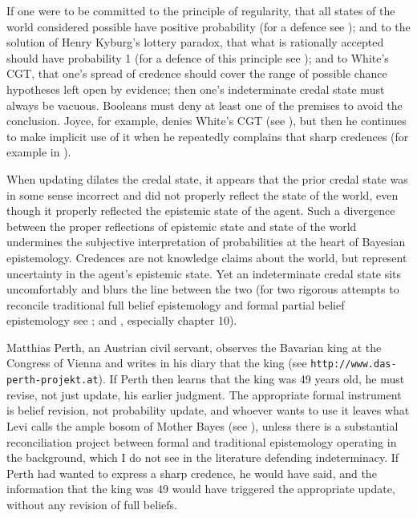 If one were to be committed to the principle of regularity, that all states of the world considered possible have positive probability (for a defence see ); and to the solution of Henry Kyburg's lottery paradox, that what is rationally accepted should have probability 1 (for a defence of this principle see ); and to White's CGT, that one's spread of credence should cover the range of possible chance hypotheses left open by evidence; then one's indeterminate credal state must always be vacuous. Booleans must deny at least one of the premises to avoid the conclusion. Joyce, for example, denies White's CGT (see ), but then he continues to make implicit use of it when he repeatedly complains that sharp credences  (for example in ).

When updating dilates the credal state, it appears that the prior credal state was in some sense incorrect and did not properly reflect the state of the world, even though it properly reflected the epistemic state of the agent. Such a divergence between the proper reflections of epistemic state and state of the world undermines the subjective interpretation of probabilities at the heart of Bayesian epistemology. Credences are not knowledge claims about the world, but represent uncertainty in the agent's epistemic state. Yet an indeterminate credal state sits uncomfortably and blurs the line between the two (for two rigorous attempts to reconcile traditional full belief epistemology and formal partial belief epistemology see ; and , especially chapter 10).

Matthias Perth, an Austrian civil servant, observes the Bavarian king at the Congress of Vienna and writes in his diary that the king  (see \texttt{http://www.das-perth-projekt.at}). If Perth then learns that the king was 49 years old, he must revise, not just update, his earlier judgment. The appropriate formal instrument is belief revision, not probability update, and whoever wants to use it leaves what Levi calls the ample bosom of Mother Bayes (see ), unless there is a substantial reconciliation project between formal and traditional epistemology operating in the background, which I do not see in the literature defending indeterminacy. If Perth had wanted to express a sharp credence, he would have said,  and the information that the king was 49 would have triggered the appropriate update, without any revision of full beliefs.

